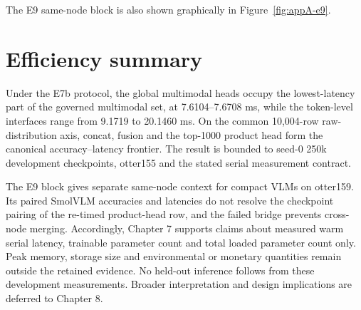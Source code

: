 The E9 same-node block is also shown graphically in Figure~\ref{fig:appA-e9}.

\clearpage
\section{Efficiency summary}
\label{sec:ch7-summary}

Under the E7b protocol, the global multimodal heads occupy the lowest-latency
part of the governed multimodal set, at 7.6104--7.6708 ms, while the token-level
interfaces range from 9.1719 to 20.1460 ms. On the common 10,004-row
raw-distribution axis, concat, fusion and the top-1000 product head form the
canonical accuracy--latency frontier. The result is bounded to seed-0 250k
development checkpoints, otter155 and the stated serial measurement contract.

The E9 block gives separate same-node context for compact VLMs on otter159.
Its paired SmolVLM accuracies and latencies do not resolve the checkpoint
pairing of the re-timed product-head row, and the failed bridge prevents
cross-node merging. Accordingly, Chapter 7 supports claims about measured
warm serial latency, trainable parameter count and total loaded parameter
count only. Peak memory, storage size and environmental or monetary quantities
remain outside the retained evidence. No held-out inference follows from
these development measurements. Broader interpretation and design
implications are deferred to Chapter 8.
